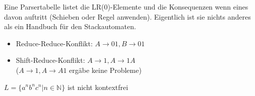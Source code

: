 \documentclass[a4paper]{article}
\begin{document}
\begin{multicols}{2}
	\begin{fmerke}[Parsertabelle]
	Eine Parsertabelle listet die LR(0)-Elemente und die Konsequenzen wenn eines davon auftritt (Schieben oder Regel anwenden). Eigentlich ist sie nichts anderes als ein Handbuch für den Stackautomaten.
	\end{fmerke}

	\begin{fmerke}[Konflikte]
	\begin{itemize}
		\item Reduce-Reduce-Konflikt: $A \rightarrow 01, B \rightarrow 01$
		\item Shift-Reduce-Konflikt: $A \rightarrow 1, A \rightarrow 1A$ \\
     ($A \rightarrow 1, A \rightarrow A1$ ergäbe keine Probleme)
	\end{itemize}
	\end{fmerke}

	$L = \{a^n b^n c^n | n \in \mathbb{N}\}$ ist nicht kontextfrei

	\end{multicols}	
	

\newpage
\end{document}
